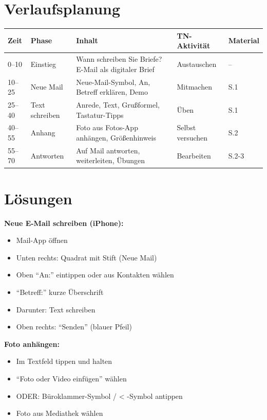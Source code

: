 \documentclass[11pt,a4paper]{article}
\begin{document}
\section{Verlaufsplanung}

\begin{longtable}{|p{1cm}|p{2cm}|p{5cm}|p{3cm}|p{2cm}|}
\hline
\textbf{Zeit} & \textbf{Phase} & \textbf{Inhalt} & \textbf{TN-Aktivität} & \textbf{Material} \\
\hline
0--10 & Einstieg & Wann schreiben Sie Briefe? E-Mail als digitaler Brief & Austauschen & -- \\
\hline
10--25 & Neue Mail & Neue-Mail-Symbol, An, Betreff erklären, Demo & Mitmachen & S.1 \\
\hline
25--40 & Text schreiben & Anrede, Text, Grußformel, Tastatur-Tipps & Üben & S.1 \\
\hline
40--55 & Anhang & Foto aus Fotos-App anhängen, Größenhinweis & Selbst versuchen & S.2 \\
\hline
55--70 & Antworten & Auf Mail antworten, weiterleiten, Übungen & Bearbeiten & S.2-3 \\
\hline
\end{longtable}

\section{Lösungen}

\textbf{Neue E-Mail schreiben (iPhone):}
\begin{itemize}
    \item Mail-App öffnen
    \item Unten rechts: Quadrat mit Stift (Neue Mail)
    \item Oben ``An:'' eintippen oder aus Kontakten wählen
    \item ``Betreff:'' kurze Überschrift
    \item Darunter: Text schreiben
    \item Oben rechts: ``Senden'' (blauer Pfeil)
\end{itemize}

\textbf{Foto anhängen:}
\begin{itemize}
    \item Im Textfeld tippen und halten
    \item ``Foto oder Video einfügen'' wählen
    \item ODER: Büroklammer-Symbol / < -Symbol antippen
    \item Foto aus Mediathek wählen
\end{itemize}
\end{document}
